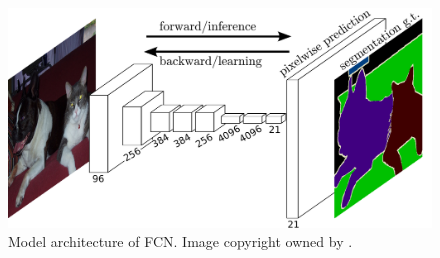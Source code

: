 \begin{figure}[!h]
	\centering
	\includegraphics[width=\figfi\textwidth]{2-04.pdf}
    \caption[Model architecture of FCN]{Model architecture of FCN. Image copyright owned by \cite{fcn}.}
    \label{fig:mdlfcn}
\end{figure}